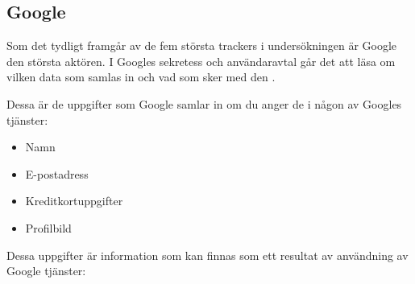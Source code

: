 \documentclass[a4paper,11pt]{article}
\begin{document}
{\subsection{Google}
Som det tydligt framgår av de fem största trackers i undersökningen är Google den största aktören. I Googles sekretess och användaravtal går det att läsa om vilken data som samlas in och vad som sker med den \cite{GooglePrivacyPolicy}.

Dessa är de uppgifter som Google samlar in om du anger de i någon av Googles tjänster: 

\begin{itemize}
 \item Namn
 \item E-postadress
 \item Kreditkortuppgifter
 \item Profilbild
\end{itemize}


Dessa uppgifter är information som kan finnas som ett resultat av användning av Google tjänster: 

}
\end{document}
